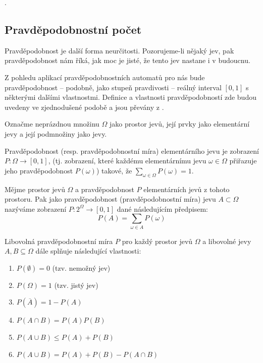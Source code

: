 \documentclass[a4paper,10pt]{article}
\begin{document}
.

% 
% 

\subsection{Pravděpodobnostní počet}
Pravděpodobnost je další forma neurčitosti. Pozorujeme-li nějaký jev, pak pravděpodobnost nám říká, jak moc je jisté, že tento jev nastane i v budoucnu. 

Z pohledu aplikací pravděpodobnostních automatů pro nás bude pravděpodobnost -- podobně, jako stupeň pravdivosti -- reálný interval $[0, 1]$ s některými dalšími vlastnostmi. Definice a vlastnosti pravděpodobností zde budou uvedeny ve zjednodušené podobě a jsou převány z \cite{Joh-ProbStaComSci}. 

\begin{definition}
  Označme neprázdnou množinu $\Omega$ jako prostor jevů, její prvky jako elementární jevy a její podmnožiny jako jevy.  
\end{definition}

\begin{definition}
 Pravděpodobnost (resp. pravděpodobnostní míra) elementárního jevu je zobrazení $P: \Omega \rightarrow [0,1]$, (tj. zobrazení, které každému elementárnímu jevu $\omega \in \Omega$ přiřazuje jeho pravděpodobnost $P(\omega)$) takové, že $\sum_{\omega \in \Omega} P(\omega) = 1$.
\end{definition}

\begin{definition}
 Mějme prostor jevů $\Omega$ a pravděpodobnost $P$ elementárních jevů z tohoto prostoru. Pak jako pravděpodobnost (pravděpodobnostní míra) jevu $A \subset \Omega$ nazýváme zobrazení $P: 2^\Omega \rightarrow [0,1]$ dané následujícím předpisem:
  $$
    P(A) = \sum_{\omega \in A} P(\omega)
  $$
\end{definition}

Libovolná pravděpodobnostní míra $P$ pro každý prostor jevů $\Omega$ a libovolné jevy $A, B \subseteq \Omega$ dále splňuje následující vlastnosti:
\begin{enumerate}
 \item $P(\emptyset) = 0$ (tzv. nemožný jev)
 \item $P(\Omega) = 1$ (tzv. jistý jev)
 \item $P(\overline{A}) = 1 - P(A)$
 \item $P(A \cap B) = P(A) P(B)$
 \item $P(A \cup B) \leq P(A) + P(B)$
 \item $P(A \cup B) = P(A) + P(B) - P(A \cap B)$
\end{enumerate}
\end{document}
